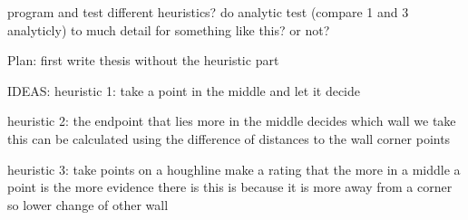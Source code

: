 program and test different heuristics?
do analytic test (compare 1 and 3 analyticly)
	to much detail for something like this? or not?

Plan:
first write thesis without the heuristic part

IDEAS:
heuristic 1:
take a point in the middle and let it decide

heuristic 2:
the endpoint that lies more in the middle decides which wall we take
this can be calculated using the difference of distances to the wall corner points

heuristic 3:
take points on a houghline
make a rating that the more in a middle a point is the more evidence there is
this is because it is more away from a corner so lower change of other wall




